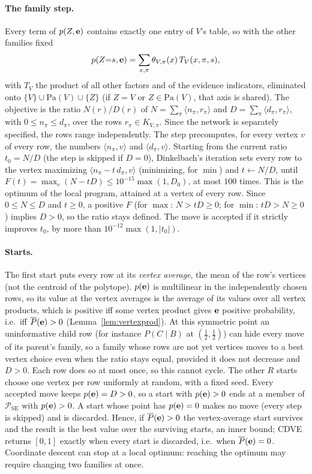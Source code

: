 \documentclass{article} %
\providecommand{\Pa}{\mathrm{Pa}}
\begin{document}
\paragraph{The family step.}
Every term of $p(Z,\mathbf{e})$ contains exactly one entry of $V$'s table, so with the other
families fixed
\[
  p(Z{=}s,\mathbf{e})=\sum_{x,\pi}\theta_{V,\pi}(x)\,T_V(x,\pi,s),
\]
with $T_V$ the product of all other factors and of the evidence indicators,
eliminated onto $\{V\}\cup\Pa(V)\cup\{Z\}$ (if $Z=V$ or $Z\in\Pa(V)$, that axis is
shared). The objective is the ratio $N(r)/D(r)$ of $N=\sum_\pi\langle
n_\pi,r_\pi\rangle$ and $D=\sum_\pi\langle d_\pi,r_\pi\rangle$, with
$0\le n_\pi\le d_\pi$, over the rows $r_\pi\in K_{V,\pi}$. Since the network is
separately specified, the rows range independently. The step precomputes, for every
vertex $v$ of every row, the numbers $\langle n_\pi,v\rangle$ and $\langle d_\pi,v\rangle$.
Starting from the current ratio $t_0=N/D$ (the step is skipped if $D=0$), Dinkelbach's
iteration sets every row to the vertex maximizing $\langle n_\pi-t\,d_\pi,v\rangle$
(minimizing, for $\min$) and $t\gets N/D$, until $F(t)=\max_r(N-tD)\le
10^{-15}\max(1,D_0)$, at most $100$ times. This is the optimum of the local program,
attained at a vertex of every row. Since $0\le N\le D$ and $t\ge0$, a positive $F$ (for
$\max$: $N>tD\ge0$; for $\min$: $tD>N\ge0$) implies $D>0$, so the ratio stays defined. The
move is accepted if it strictly improves $t_0$, by more than $10^{-12}\max(1,|t_0|)$.

\paragraph{Starts.}
The first start puts every row at its \emph{vertex average}, the mean of the row's vertices
(not the centroid of the polytope). $p(\mathbf{e})$ is multilinear in the independently chosen
rows, so its value at the vertex averages is the average of its values over all vertex
products, which is positive iff some vertex product gives $\mathbf{e}$ positive probability, i.e.\
iff $\overline P(\mathbf{e})>0$ (Lemma~\ref{lem:vertexprod}). At this symmetric point an
uninformative child row (for instance $P(C\mid B)$ at $(\tfrac12,\tfrac12)$) can hide every
move of its parent's family, so a family whose rows are not yet vertices moves to a best
vertex choice even when the ratio stays equal, provided it does not decrease and $D>0$. Each
row does so at most once, so this cannot cycle. The other $R$ starts choose one vertex per
row uniformly at random, with a fixed seed. Every accepted move keeps $p(\mathbf{e})=D>0$, so a
start with $p(\mathbf{e})>0$ ends at a member of $\mathcal P_{\mathrm{SE}}$ with $p(\mathbf{e})>0$. A start
whose point has $p(\mathbf{e})=0$ makes no move (every step is skipped) and is discarded. Hence, if
$\overline P(\mathbf{e})>0$ the vertex-average start survives and the result is the best value over
the surviving starts, an inner bound; CDVE returns $[0,1]$ exactly when every start is
discarded, i.e.\ when $\overline P(\mathbf{e})=0$. Coordinate descent can stop at a local optimum:
reaching the optimum may require changing two families at once.
\end{document}
